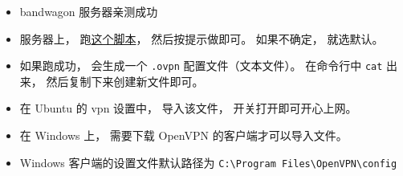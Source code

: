 
\begin{issues}
\issueDraft
\end{issues}

\begin{itemize}
\item bandwagon 服务器亲测成功
\item 服务器上， 跑\href{https://github.com/MacroUniverse/openvpn-install/blob/master/openvpn-install.sh}{这个脚本}， 然后按提示做即可。 如果不确定， 就选默认。
\item 如果跑成功， 会生成一个 \verb|.ovpn| 配置文件（文本文件）。 在命令行中 \verb|cat| 出来， 然后复制下来创建新文件即可。
\item 在 Ubuntu 的 vpn 设置中， 导入该文件， 开关打开即可开心上网。
\item 在 Windows 上， 需要下载 OpenVPN 的客户端才可以导入文件。
\item Windows 客户端的设置文件默认路径为 \verb|C:\Program Files\OpenVPN\config|
\end{itemize}
